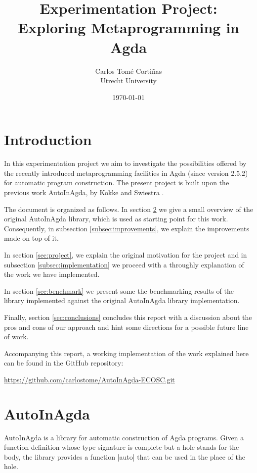 \documentclass[a4paper]{article}
\author{Carlos Tom\'e Corti\~nas \\ Utrecht University}
\title{Experimentation Project: Exploring Metaprogramming in Agda}
\date{\today}
\begin{document}
\maketitle

\section{Introduction}

In this experimentation project we aim to investigate the possibilities offered
by the recently introduced metaprogramming facilities in Agda (since version
2.5.2) for automatic program construction. The present project is built upon the
previous work AutoInAgda, by Kokke and Swiestra \cite{Kokke2015}.

The document is organized as follows. In section \ref{sec:AutoInAgda} we give a
small overview of the original AutoInAgda library, which is used as starting
point for this work. Consequently, in subsection \ref{subsec:improvements}, we
explain the improvements made on top of it.

In section \ref{sec:project}, we explain the original motivation for the project
and in subsection \ref{subsec:implementation} we proceed with a throughly
explanation of the work we have implemented.

In section \ref{sec:benchmark} we present some the benchmarking results of the
library implemented against the original AutoInAgda library implementation.

Finally, section \ref{sec:conclusions} concludes this report with a discussion
about the pros and cons of our approach and hint some directions for a possible
future line of work.

Accompanying this report, a working implementation of the work explained here
can be found in the GitHub repository:

\begin{center}
\url{https://github.com/carlostome/AutoInAgda-ECOSC.git}
\end{center}

\section{AutoInAgda}
\label{sec:AutoInAgda}

AutoInAgda is a library for automatic construction of Agda programs. Given a
function definition whose type signature is complete but a hole stands for the
body, the library provides a function |auto| that can be used in the place of
the hole.
\end{document}
